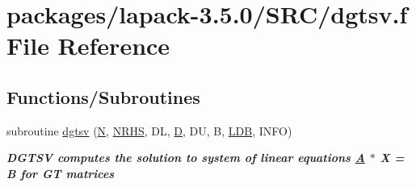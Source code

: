 \hypertarget{dgtsv_8f}{}\section{packages/lapack-\/3.5.0/\+S\+R\+C/dgtsv.f File Reference}
\label{dgtsv_8f}
\subsection*{Functions/\+Subroutines}
\begin{DoxyCompactItemize}
\item 
subroutine \hyperlink{group__doubleGTsolve_ga2bf93f2ddefa5e671866eb2191dc19d4}{dgtsv} (\hyperlink{polmisc_8c_a0240ac851181b84ac374872dc5434ee4}{N}, \hyperlink{example__user_8c_aa0138da002ce2a90360df2f521eb3198}{N\+R\+H\+S}, D\+L, \hyperlink{odrpack_8h_a7dae6ea403d00f3687f24a874e67d139}{D}, D\+U, B, \hyperlink{example__user_8c_a50e90a7104df172b5a89a06c47fcca04}{L\+D\+B}, I\+N\+F\+O)
\begin{DoxyCompactList}\small\item\em {\bfseries  D\+G\+T\+S\+V computes the solution to system of linear equations \hyperlink{classA}{A} $\ast$ X = B for G\+T matrices {\bfseries  }}\end{DoxyCompactList}\end{DoxyCompactItemize}
